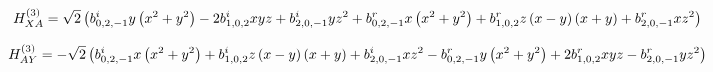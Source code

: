 \documentclass[fleqn]{article}
\begin{document}
\begin{dmath*}
H_{XA}^{(3)}=\sqrt{2} \left(b^{i}_{0,2,-1} y \left(x^{2} + y^{2}\right) - 2 b^{i}_{1,0,2} x y z + b^{i}_{2,0,-1} y z^{2} + b^{r}_{0,2,-1} x \left(x^{2} + y^{2}\right) + b^{r}_{1,0,2} z \left(x - y\right) \left(x + y\right) + b^{r}_{2,0,-1} x z^{2}\right)\\
\end{dmath*}

\begin{dmath*}
H_{AY}^{(3)}=-  \sqrt{2} \left( b^{i}_{0,2,-1} x \left(x^{2} + y^{2}\right) +  b^{i}_{1,0,2} z \left(x - y\right) \left(x + y\right) +  b^{i}_{2,0,-1} x z^{2} -  b^{r}_{0,2,-1} y \left(x^{2} + y^{2}\right) + 2 b^{r}_{1,0,2} x y z -  b^{r}_{2,0,-1} y z^{2}\right)\\
\end{dmath*}
\end{document}

